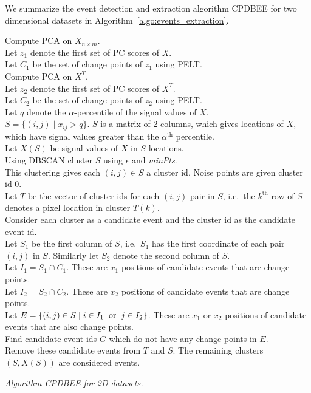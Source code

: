 \documentclass[a4paper,11pt]{article}
\begin{document}
We summarize the event detection and extraction algorithm CPDBEE for two dimensional datasets in Algorithm~\ref{algo:events_extraction}.

\DontPrintSemicolon
\begin{algorithm}\fontsize{9}{10}\selectfont
	Compute PCA on $X_{n\times m}$. \\
	Let $z_1$ denote the first set of PC scores of $X$. \\
	Let $C_1$ be the set of change points of $z_1$ using PELT\@. \\
	Compute PCA on $X^T$. \\
	Let $z_2$ denote the first set of PC scores of $X^T$. \\
	Let $C_2$ be the set of change points of $z_2$ using PELT\@. \\
	Let $q$ denote the $\alpha$-percentile of the signal values of $X$. \\
	$S = \{ (i,j) \mid x_{ij} > q \}$. $S$ is a matrix of 2 columns, which gives locations of $X$, which have signal values greater than the $\alpha^{\text{th}}$ percentile. \\
	Let $X(S)$ be signal values of $X$ in $S$ locations. \\
	Using DBSCAN cluster $S$ using $\epsilon$ and \textit{minPts}. \\
	This clustering gives each $(i,j) \in S$ a cluster id. Noise points are given cluster id $0$.\\
	Let $T$ be the vector of cluster ids for each $(i,j)$ pair in $S$, i.e.\ the $k^{\text{th}}$ row of $S$ denotes a pixel location in cluster $T(k)$. \\
	Consider each cluster as a candidate event and the cluster id as the candidate event id. \\
	Let $S_1$ be the first column of $S$, i.e.\ $S_1$ has the first coordinate of each pair $(i, j)$ in $S$. Similarly let $S_2$ denote the second column of $S$. \\
	Let $I_1 = S_1 \cap C_1$. These are $x_1$ positions of candidate events that are change points. \\
	Let $I_2 = S_2 \cap C_2$. These are $x_2$ positions of candidate events that are change points. \\
	Let $E = \{ (i,j) \in S \mid i \in I_1 \hspace{2mm} \text{or} \hspace{2mm} j \in I_2 \}$. These are $x_1$ or $x_2$ positions of candidate events that are also change points. \\
	Find candidate event ids $G$ which do not have any change points in $E$. \\
	Remove these candidate events from $T$ and $S$. The remaining clusters $(S, X(S))$ are considered events.
	\caption{\itshape Algorithm CPDBEE for 2D datasets.}
  \label{algo:events_extraction}
\end{algorithm}
\end{document}
